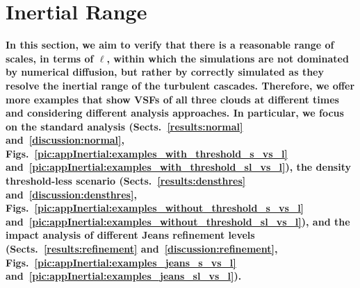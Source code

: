 
\section{Inertial Range}\label{appInertial}


\textbf{\noindent
    In this section, we aim to verify that there is a reasonable range of scales, in terms of $\ell$, within which the simulations are not dominated by numerical diffusion, but rather by correctly simulated as they resolve the inertial range of the turbulent cascades.
    Therefore, we offer more examples that show VSFs of all three clouds at different times and considering different analysis approaches.
    In particular, we focus on the standard analysis (Sects.~\ref{results:normal} and~\ref{discussion:normal}, Figs.~\ref{pic:appInertial:examples_with_threshold_s_vs_l} and~\ref{pic:appInertial:examples_with_threshold_sl_vs_l}), the density threshold-less scenario (Sects.~\ref{results:densthres} and~\ref{discussion:densthres}, Figs.~\ref{pic:appInertial:examples_without_threshold_s_vs_l} and~\ref{pic:appInertial:examples_without_threshold_sl_vs_l}), and the impact analysis of different Jeans refinement levels (Sects.~\ref{results:refinement} and~\ref{discussion:refinement}, Figs.~\ref{pic:appInertial:examples_jeans_s_vs_l} and~\ref{pic:appInertial:examples_jeans_sl_vs_l}).
}
 	
